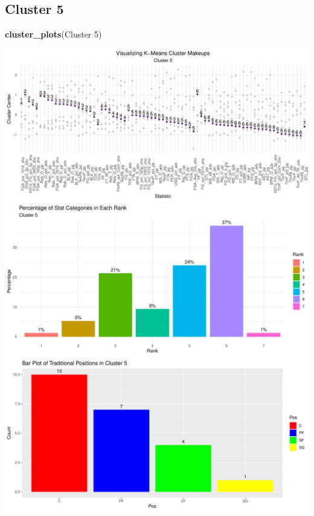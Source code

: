 \documentclass[
]{article}
\newenvironment{Shaded}{\begin{snugshade}}{\end{snugshade}}
\newcommand{\FunctionTok}[1]{\textcolor[rgb]{0.13,0.29,0.53}{\textbf{#1}}}
\newcommand{\NormalTok}[1]{#1}
\newcommand{\StringTok}[1]{\textcolor[rgb]{0.31,0.60,0.02}{#1}}
\begin{document}
\hypertarget{cluster-5}{%
\subsection{Cluster 5}\label{cluster-5}}

\begin{Shaded}
\begin{Highlighting}[]
\FunctionTok{cluster\_plots}\NormalTok{(}\StringTok{\textquotesingle{}Cluster 5\textquotesingle{}}\NormalTok{)}
\end{Highlighting}
\end{Shaded}

\includegraphics{Reclassifying-NBA-Player-Postions-Pt.-3---Clustering-Analysis-Results_files/figure-latex/unnamed-chunk-6-1.pdf}
\includegraphics{Reclassifying-NBA-Player-Postions-Pt.-3---Clustering-Analysis-Results_files/figure-latex/unnamed-chunk-6-2.pdf}
\includegraphics{Reclassifying-NBA-Player-Postions-Pt.-3---Clustering-Analysis-Results_files/figure-latex/unnamed-chunk-6-3.pdf}
\end{document}
